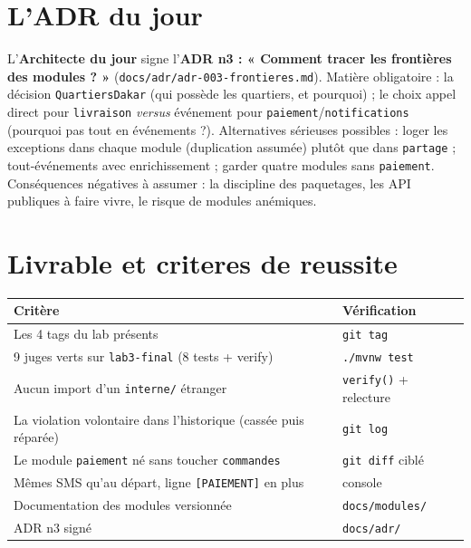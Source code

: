 \documentclass[a4paper,11pt]{article}
\begin{document}
\section{L'ADR du jour}

L'\textbf{Architecte du jour} signe l'\textbf{ADR n3 : « Comment
tracer les frontières des modules ? »}
(\texttt{docs/adr/adr-003-frontieres.md}). Matière obligatoire : la
décision \texttt{QuartiersDakar} (qui possède les quartiers, et pourquoi) ;
le choix appel direct pour \texttt{livraison} \emph{versus} événement pour
\texttt{paiement}/\texttt{notifications} (pourquoi pas tout en
événements ?). Alternatives sérieuses possibles : loger les exceptions dans chaque
module (duplication assumée) plutôt que dans \texttt{partage} ; tout-événements avec
enrichissement ; garder quatre modules sans \texttt{paiement}.
Conséquences négatives à assumer : la discipline des paquetages, les API
publiques à faire vivre, le risque de modules anémiques.

\section{Livrable et criteres de reussite}

\begin{center}
\small
\begin{tabular}{p{}p{}}
\toprule
\textbf{Critère} & \textbf{Vérification} \\
\midrule
Les 4 tags du lab présents & \texttt{git tag} \\
9 juges verts sur \texttt{lab3-final} (8 tests + verify) & \texttt{./mvnw test} \\
Aucun import d'un \texttt{interne/} étranger & \texttt{verify()} + relecture \\
La violation volontaire dans l'historique (cassée puis réparée) & \texttt{git log} \\
Le module \texttt{paiement} né sans toucher \texttt{commandes} & \texttt{git diff} ciblé \\
Mêmes SMS qu'au départ, ligne \texttt{[PAIEMENT]} en plus & console \\
Documentation des modules versionnée & \texttt{docs/modules/} \\
ADR n\up{o}3 signé & \texttt{docs/adr/} \\
\bottomrule
\end{tabular}
\end{center}
\end{document}
